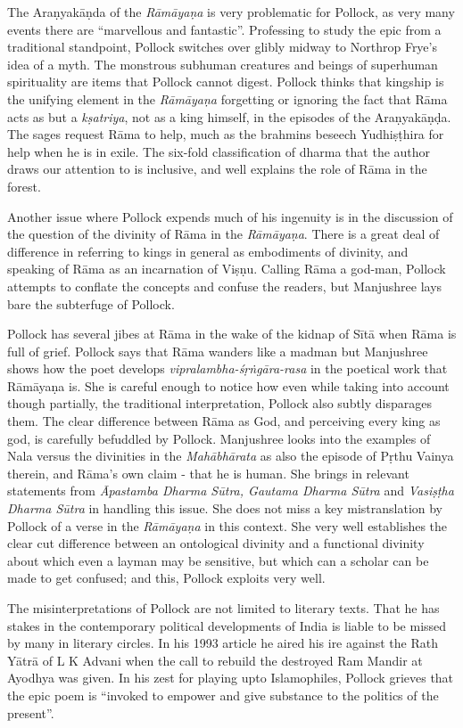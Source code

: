 The Araṇyakāṇda of the {\sl Rāmāyaṇa} is very problematic for Pollock, as very many events there are “marvellous and fantastic”. Professing to study the epic from a traditional standpoint, Pollock switches over glibly midway to Northrop Frye's idea of a myth. The monstrous subhuman creatures and beings of superhuman spirituality are items that Pollock cannot digest. Pollock thinks that kingship is the unifying element in the {\sl Rāmāyaṇa} forgetting or ignoring the fact that Rāma acts as but a {\sl kṣatriya}, not as a king himself, in the episodes of the Araṇyakāṇḍa. The sages request Rāma to help, much as the brahmins beseech Yudhiṣṭhira for help when he is in exile. The six-fold classification of dharma that the author draws our attention to is inclusive, and well explains the role of Rāma in the forest.

Another issue where Pollock expends much of his ingenuity is in the discussion of the question of the divinity of Rāma in the {\sl Rāmāyaṇa}. There is a great deal of difference in referring to kings in general as embodiments of divinity, and speaking of Rāma as an incarnation of Viṣṇu. Calling Rāma a god-man, Pollock attempts to conflate the concepts and confuse the readers, but Manjushree lays bare the subterfuge of Pollock.

Pollock has several jibes at Rāma in the wake of the kidnap of Sītā when Rāma is full of grief. Pollock says that Rāma wanders like a madman but Manjushree shows how the poet develops {\sl vipralambha-śṛṅgāra-rasa} in the poetical work that Rāmāyaṇa is. She is careful enough to notice how even while taking into account though partially, the traditional interpretation, Pollock also subtly disparages them. The clear difference between Rāma as God, and perceiving every king as god, is carefully befuddled by Pollock. Manjushree looks into the examples of Nala versus the divinities in the {\sl Mahābhārata} as also the episode of Pṛthu Vainya therein, and Rāma's own claim - that he is human. She brings in relevant statements from {\sl Āpastamba Dharma Sūtra, Gautama Dharma Sūtra} and {\sl Vasiṣṭha Dharma Sūtra} in handling this issue. She does not miss a key mistranslation by Pollock of a verse in the {\sl Rāmāyaṇa} in this context. She very well establishes the clear cut difference between an ontological divinity and a functional divinity about which even a layman may be sensitive, but which can a scholar can be made to get confused; and this, Pollock exploits very well.

The misinterpretations of Pollock are not limited to literary texts. That he has stakes in the contemporary political developments of India is liable to be missed by many in literary circles. In his 1993 article he aired his ire against the Rath Yātrā of L K Advani when the call to rebuild the destroyed Ram Mandir at Ayodhya was given. In his zest for playing upto Islamophiles, Pollock grieves that the epic poem is “invoked to empower and give substance to the politics of the present”.

